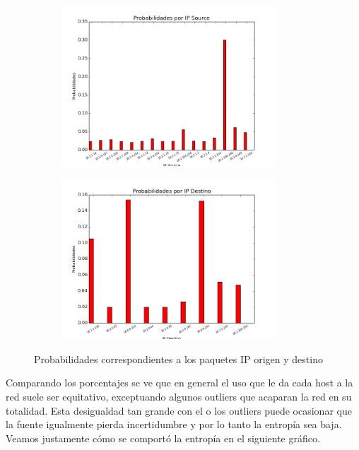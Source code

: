 \begin{figure}[H]

\begin{subfigure}{0.6\textwidth}
\includegraphics[width=0.9\linewidth, height=6cm]{imagenes/exp2/6v2ProbabilidadesIPSource}
\caption{}
\end{subfigure}
\begin{subfigure}{0.6\textwidth}
\includegraphics[width=0.9\linewidth, height=6cm]{imagenes/exp2/7v2ProbabilidadesIPDestino}
\caption{}
\end{subfigure}

\caption{Probabilidades correspondientes a los paquetes IP origen y destino}
\label{fig:1}
\end{figure}

Comparando los porcentajes se ve que en general el uso que le da cada host a la red suele ser equitativo, exceptuando algunos outliers que acaparan la red en su totalidad. Esta desigualdad tan grande con el o los outliers puede ocasionar que la fuente igualmente pierda incertidumbre y por lo tanto la entrop\'ia sea baja. Veamos justamente c\'omo se comport\'o la entrop\'ia en el siguiente gr\'afico.


